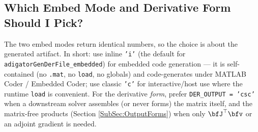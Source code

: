\documentclass[10pt,pdftex]{article}
\begin{document}
\subsection{Which Embed Mode and Derivative Form Should I Pick?}\label{SubSec:WhichMode}
The two embed modes return identical numbers, so the choice is about the generated artifact. In short: use inline \texttt{'i'} (the default for \texttt{adigatorGenDerFile\_embedded}) for embedded code generation --- it is self-contained (no \texttt{.mat}, no \texttt{load}, no globals) and code-generates under MATLAB Coder / Embedded Coder; use classic \texttt{'c'} for interactive/host use where the runtime \texttt{load} is convenient. For the derivative {\em form}, prefer \texttt{DER\_OUTPUT = 'csc'} when a downstream solver assembles (or never forms) the matrix itself, and the matrix-free products (Section \ref{SubSec:OutputForms}) when only $\bfJ^\top\bfv$ or an adjoint gradient is needed.
\end{document}
